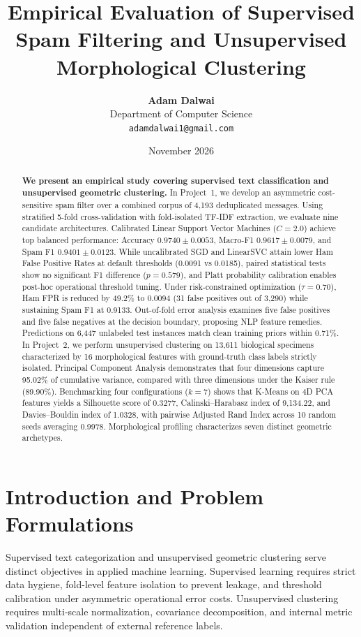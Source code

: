 \documentclass[9.5pt,twocolumn,letterpaper]{article}
\title{\vspace{-0.3in}\textbf{\Large Empirical Evaluation of Supervised Spam Filtering and Unsupervised Morphological Clustering}\vspace{-0.08in}}
\author{\textbf{Adam Dalwai} \\ Department of Computer Science \\ \texttt{adamdalwai1@gmail.com}}
\date{\vspace{-0.15in}\small November 2026\vspace{-0.1in}}
\begin{document}
\maketitle

\begin{abstract}
\noindent \textbf{We present an empirical study covering supervised text classification and unsupervised geometric clustering.} In Project~1, we develop an asymmetric cost-sensitive spam filter over a combined corpus of 4,193 deduplicated messages. Using stratified 5-fold cross-validation with fold-isolated TF-IDF extraction, we evaluate nine candidate architectures. Calibrated Linear Support Vector Machines ($C=2.0$) achieve top balanced performance: Accuracy $0.9740 \pm 0.0053$, Macro-F1 $0.9617 \pm 0.0079$, and Spam F1 $0.9401 \pm 0.0123$. While uncalibrated SGD and LinearSVC attain lower Ham False Positive Rates at default thresholds (0.0091 vs 0.0185), paired statistical tests show no significant F1 difference ($p=0.579$), and Platt probability calibration enables post-hoc operational threshold tuning. Under risk-constrained optimization ($\tau=0.70$), Ham FPR is reduced by 49.2\% to 0.0094 (31 false positives out of 3,290) while sustaining Spam F1 at 0.9133. Out-of-fold error analysis examines five false positives and five false negatives at the decision boundary, proposing NLP feature remedies. Predictions on 6,447 unlabeled test instances match clean training priors within 0.71\%. In Project~2, we perform unsupervised clustering on 13,611 biological specimens characterized by 16 morphological features with ground-truth class labels strictly isolated. Principal Component Analysis demonstrates that four dimensions capture 95.02\% of cumulative variance, compared with three dimensions under the Kaiser rule (89.90\%). Benchmarking four configurations ($k=7$) shows that K-Means on 4D PCA features yields a Silhouette score of 0.3277, Calinski--Harabasz index of 9,134.22, and Davies--Bouldin index of 1.0328, with pairwise Adjusted Rand Index across 10 random seeds averaging 0.9978. Morphological profiling characterizes seven distinct geometric archetypes.
\end{abstract}

\section{Introduction and Problem Formulations}
Supervised text categorization and unsupervised geometric clustering serve distinct objectives in applied machine learning. Supervised learning requires strict data hygiene, fold-level feature isolation to prevent leakage, and threshold calibration under asymmetric operational error costs. Unsupervised clustering requires multi-scale normalization, covariance decomposition, and internal metric validation independent of external reference labels.
\end{document}
